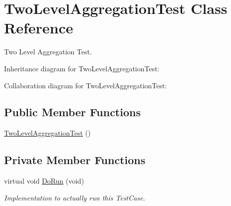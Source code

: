 \hypertarget{classTwoLevelAggregationTest}{}\section{Two\+Level\+Aggregation\+Test Class Reference}
\label{classTwoLevelAggregationTest}


Two Level Aggregation Test.  




Inheritance diagram for Two\+Level\+Aggregation\+Test\+:


Collaboration diagram for Two\+Level\+Aggregation\+Test\+:
\subsection*{Public Member Functions}
\begin{DoxyCompactItemize}
\item 
\hyperlink{classTwoLevelAggregationTest_ab3fa170a5b6de28a2d363fcc507a3f89}{Two\+Level\+Aggregation\+Test} ()
\end{DoxyCompactItemize}
\subsection*{Private Member Functions}
\begin{DoxyCompactItemize}
\item 
virtual void \hyperlink{classTwoLevelAggregationTest_a40c6f5f8be6c48673d0bfd218d95afe0}{Do\+Run} (void)
\begin{DoxyCompactList}\small\item\em Implementation to actually run this Test\+Case. \end{DoxyCompactList}\end{DoxyCompactItemize}
